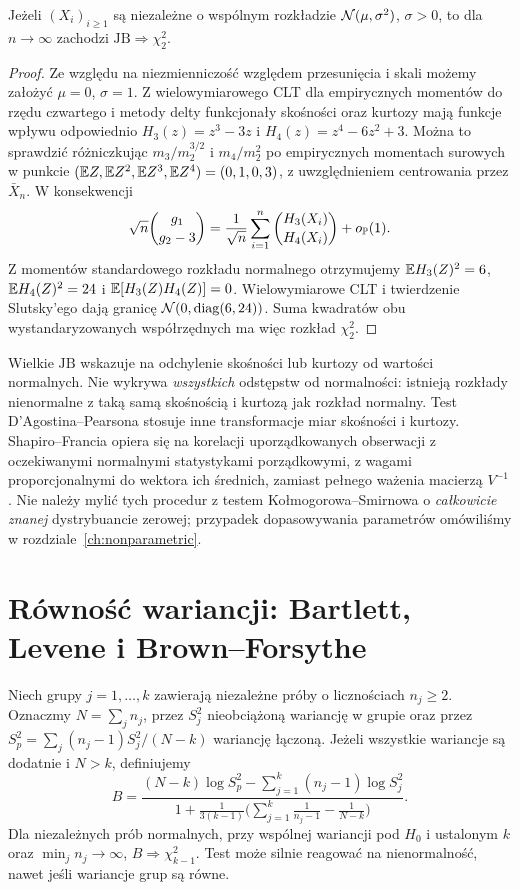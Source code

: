 \begin{twierdzenie}\label{thm:jb}
Jeżeli $(X_i)_{i\ge1}$ są niezależne o wspólnym rozkładzie $\mathcal N(\mu,\sigma^2)$, $\sigma>0$, to dla $n\to\infty$ zachodzi $\mathrm{JB}\Rightarrow\chi^2_2$.
\end{twierdzenie}
\begin{proof}
Ze względu na niezmienniczość względem przesunięcia i skali możemy założyć $\mu=0$, $\sigma=1$. Z wielowymiarowego CLT dla empirycznych momentów do rzędu czwartego i metody delty funkcjonały skośności oraz kurtozy mają funkcje wpływu odpowiednio $H_3(z)=z^3-3z$ i $H_4(z)=z^4-6z^2+3$. Można to sprawdzić różniczkując $m_3/m_2^{3/2}$ i $m_4/m_2^2$ po empirycznych momentach surowych w punkcie $(\mathbb E Z,\mathbb E Z^2,\mathbb E Z^3,\mathbb E Z^4)=(0,1,0,3)$, z uwzględnieniem centrowania przez $\bar X_n$. W konsekwencji
\[
 \sqrt n\binom{g_1}{g_2-3}=\frac1{\sqrt n}\sum_{i=1}^n\binom{H_3(X_i)}{H_4(X_i)}+o_\mathbb P(1).
\]
Z momentów standardowego rozkładu normalnego otrzymujemy $\mathbb E H_3(Z)^2=6$, $\mathbb E H_4(Z)^2=24$ i $\mathbb E[H_3(Z)H_4(Z)]=0$. Wielowymiarowe CLT i twierdzenie Slutsky'ego dają granicę $\mathcal N(0,\operatorname{diag}(6,24))$. Suma kwadratów obu wystandaryzowanych współrzędnych ma więc rozkład $\chi^2_2$.
\end{proof}

\begin{uwaga}
Wielkie $\mathrm{JB}$ wskazuje na odchylenie skośności lub kurtozy od wartości normalnych. Nie wykrywa \emph{wszystkich} odstępstw od normalności: istnieją rozkłady nienormalne z taką samą skośnością i kurtozą jak rozkład normalny. Test D'Agostina--Pearsona stosuje inne transformacje miar skośności i kurtozy. Shapiro--Francia opiera się na korelacji uporządkowanych obserwacji z oczekiwanymi normalnymi statystykami porządkowymi, z wagami proporcjonalnymi do wektora ich średnich, zamiast pełnego ważenia macierzą $V^{-1}$. Nie należy mylić tych procedur z testem Kołmogorowa--Smirnowa o \emph{całkowicie znanej} dystrybuancie zerowej; przypadek dopasowywania parametrów omówiliśmy w rozdziale~\ref{ch:nonparametric}.
\end{uwaga}

\section{Równość wariancji: Bartlett, Levene i Brown--Forsythe}
\begin{definicja}\label{def:bartlett}
Niech grupy $j=1,\ldots,k$ zawierają niezależne próby o licznościach $n_j\ge2$. Oznaczmy $N=\sum_j n_j$, przez $S_j^2$ nieobciążoną wariancję w grupie oraz przez $S_p^2=\sum_j(n_j-1)S_j^2/(N-k)$ wariancję łączoną. Jeżeli wszystkie wariancje są dodatnie i $N>k$, definiujemy
\[
 B=\frac{(N-k)\log S_p^2-\sum_{j=1}^k(n_j-1)\log S_j^2}{1+\frac1{3(k-1)}\bigl(\sum_{j=1}^k\frac1{n_j-1}-\frac1{N-k}\bigr)}.
\]
Dla niezależnych prób normalnych, przy wspólnej wariancji pod $H_0$ i ustalonym $k$ oraz $\min_j n_j\to\infty$, $B\Rightarrow\chi^2_{k-1}$. Test może silnie reagować na nienormalność, nawet jeśli wariancje grup są równe.
\end{definicja}

